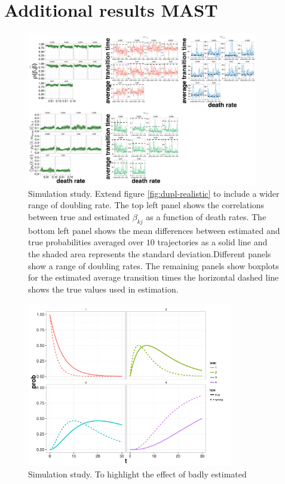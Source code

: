 \chapter{Additional results MAST}

\begin{figure}[h]
      \centering \includegraphics[width=0.9\textwidth]{pics/devide-2.pdf}
    \caption{Simulation study. Extend figure \ref{fig:dupl-realistic} to include a wider range of doubling rate. The top
left panel shows the correlations between true and estimated $\beta_{kj}$ as a function of death rates. The bottom left
panel shows the mean differences between estimated and true probabilities averaged over $10$ trajectories as a solid
line and the shaded area represents the standard deviation.Different panels show a range of doubling rates. The
remaining panels show boxplots for the estimated average transition times the horizontal dashed line shows the true
values used in estimation. }
    \label{fig:dupl-all}
\end{figure}


\begin{figure}
  \centering
  \includegraphics[width=0.8\textwidth]{pics/wrong_w.pdf}
  \caption{Simulation study. To highlight the effect of badly estimated}
  \label{fig:wrong_w}
\end{figure}


